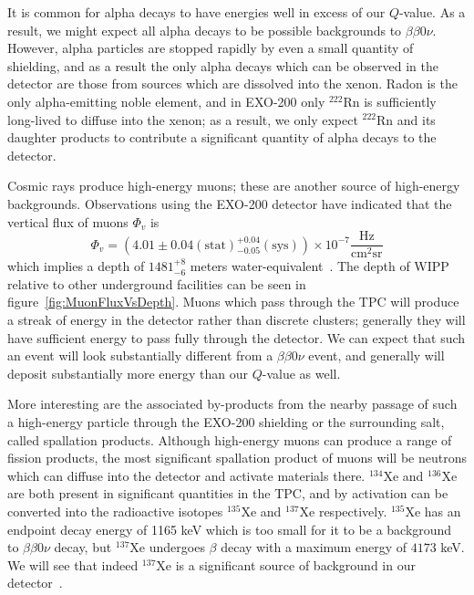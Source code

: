 It is common for alpha decays to have energies well in excess of our $Q$-value.  As a result, we might expect all alpha decays to be possible backgrounds to $\beta\beta 0\nu$.  However, alpha particles are stopped rapidly by even a small quantity of shielding, and as a result the only alpha decays which can be observed in the detector are those from sources which are dissolved into the xenon.  Radon is the only alpha-emitting noble element, and in EXO-200 only $^{222}$Rn is sufficiently long-lived to diffuse into the xenon; as a result, we only expect $^{222}$Rn and its daughter products to contribute a significant quantity of alpha decays to the detector.

Cosmic rays produce high-energy muons; these are another source of high-energy backgrounds.  Observations using the EXO-200 detector have indicated that the vertical flux of muons $\Phi_v$ is
\begin{equation}
\Phi_v =  \left(4.01 \pm 0.04(\mathrm{stat}){}^{+0.04}_{-0.05} (\mathrm{sys})\right) \times 10^{-7} \frac{\mathrm{Hz}}{\mathrm{cm}^2 \mathrm{sr}}
\end{equation}
which implies a depth of $1481^{+8}_{-6}$ meters water-equivalent~\cite{ThesisSteve}.  The depth of WIPP relative to other underground facilities can be seen in figure~\ref{fig:MuonFluxVsDepth}.  Muons which pass through the TPC will produce a streak of energy in the detector rather than discrete clusters; generally they will have sufficient energy to pass fully through the detector.  We can expect that such an event will look substantially different from a $\beta\beta 0\nu$ event, and generally will deposit substantially more energy than our $Q$-value as well.

More interesting are the associated by-products from the nearby passage of such a high-energy particle through the EXO-200 shielding or the surrounding salt, called spallation products.  Although high-energy muons can produce a range of fission products, the most significant spallation product of muons will be neutrons which can diffuse into the detector and activate materials there.  $^{134}$Xe and $^{136}$Xe are both present in significant quantities in the TPC, and by activation can be converted into the radioactive isotopes $^{135}$Xe and $^{137}$Xe respectively.  $^{135}$Xe has an endpoint decay energy of 1165 keV which is too small for it to be a background to $\beta\beta 0\nu$ decay, but $^{137}$Xe undergoes $\beta$ decay with a maximum energy of $4173$ keV.  We will see that indeed $^{137}$Xe is a significant source of background in our detector~\cite{NewEXObb0nPaper_2014,NeutronCaptureGammas}.

